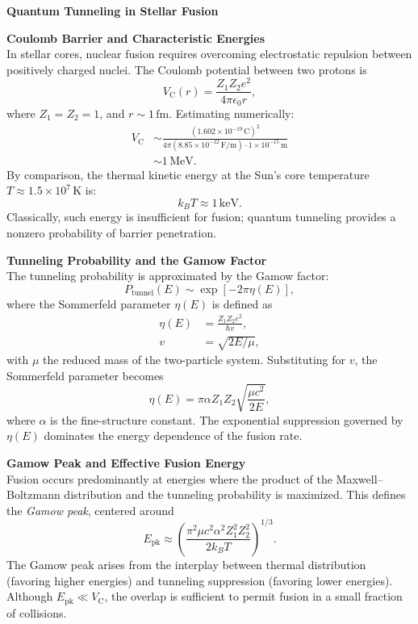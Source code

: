 \begin{technical}
    {\Large\textbf{Quantum Tunneling in Stellar Fusion}}
    
    \textbf{Coulomb Barrier and Characteristic Energies}\\[0.5em]
    In stellar cores, nuclear fusion requires overcoming electrostatic repulsion between positively charged nuclei. The Coulomb potential between two protons is
    \[
    V_\text{C}(r) = \frac{Z_1 Z_2 e^2}{4\pi \epsilon_0 r},
    \]
    where \( Z_1 = Z_2 = 1 \), and \( r \sim 1\,\text{fm} \). Estimating numerically:
    \begin{align*}
    V_\text{C} &\sim \frac{(1.602 \times 10^{-19}\,\text{C})^2}{4\pi (8.85 \times 10^{-12}\,\text{F/m}) \cdot 1 \times 10^{-15}\,\text{m}}\\
               &\sim 1\,\text{MeV}.
    \end{align*}
    By comparison, the thermal kinetic energy at the Sun’s core temperature \( T \approx 1.5 \times 10^7\,\text{K} \) is:
    \[
    k_B T \approx 1\,\text{keV}.
    \]
    Classically, such energy is insufficient for fusion; quantum tunneling provides a nonzero probability of barrier penetration.
    
    \vspace{0.7em}
    \textbf{Tunneling Probability and the Gamow Factor}\\[0.5em]
    The tunneling probability is approximated by the Gamow factor:
    \[
    P_\text{tunnel}(E) \sim \exp\left[-2\pi \eta(E)\right],
    \]
    where the Sommerfeld parameter \(\eta(E)\) is defined as
    \begin{align*}
    \eta(E) &= \frac{Z_1 Z_2 e^2}{\hbar v}, \\
    v &= \sqrt{2E/\mu},
    \end{align*}
    with \(\mu\) the reduced mass of the two-particle system. Substituting for \(v\), the Sommerfeld parameter becomes
    \[
    \eta(E) = \pi \alpha Z_1 Z_2 \sqrt{\frac{\mu c^2}{2E}},
    \]
    where \(\alpha\) is the fine-structure constant. The exponential suppression governed by \(\eta(E)\) dominates the energy dependence of the fusion rate.
    
    \vspace{0.7em}
    \textbf{Gamow Peak and Effective Fusion Energy}\\[0.5em]
    Fusion occurs predominantly at energies where the product of the Maxwell–Boltzmann distribution and the tunneling probability is maximized. This defines the \emph{Gamow peak}, centered around
    \[
    E_\text{pk} \approx \left( \frac{\pi^2 \mu c^2 \alpha^2 Z_1^2 Z_2^2}{2 k_B T} \right)^{1/3}.
    \]
    The Gamow peak arises from the interplay between thermal distribution (favoring higher energies) and tunneling suppression (favoring lower energies). Although \( E_\text{pk} \ll V_\text{C} \), the overlap is sufficient to permit fusion in a small fraction of collisions.
    

\end{technical}
